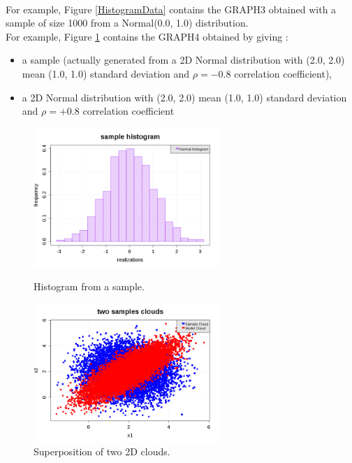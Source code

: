 \textspace\\



For example, Figure \ref{HistogramData} contains the  GRAPH3 obtained with a sample of size 1000 from a Normal(0.0, 1.0) distribution.\\

For example, Figure \ref{superpositionTwoclouds} contains the GRAPH4 obtained by giving :
\begin{itemize}
\item a sample (actually generated from a 2D Normal distribution with (2.0, 2.0) mean (1.0, 1.0) standard deviation and $\rho = -0.8$ correlation coefficient),
\item a 2D Normal distribution with (2.0, 2.0) mean (1.0, 1.0) standard deviation and $\rho = +0.8$ correlation coefficient
\end{itemize}


\begin{figure}[H]
  \begin{minipage}{9.8cm}
    \begin{center}
      \includegraphics[width=7cm]{hist_Data.png}
      \caption{Histogram from a sample.}
      \label{HistogramData}
    \end{center}
  \end{minipage}
  \hfill
  \begin{minipage}{9.8cm}
    \begin{center}
      \includegraphics[width=7cm]{cloud1.png}
      \caption{Superposition of two 2D clouds.}
      \label{superpositionTwoclouds}
    \end{center}
  \end{minipage}
\end{figure}


